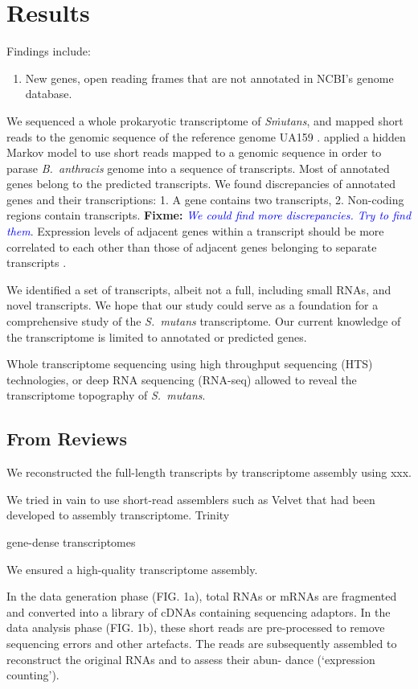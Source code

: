\documentclass{article}
\newcommand{\fixme}[1]{{\textbf{Fixme:} \textit{\textcolor{blue}{#1}}}}
\begin{document}
\section{Results}

Findings include:
\begin{enumerate}
\item New genes, open reading frames that are not annotated in NCBI's genome database.
\end{enumerate}

We sequenced a whole prokaryotic transcriptome of \textit{S\. mutans}, and
mapped short reads to the genomic sequence of the reference genome UA159
\citep{Ajdic2002}. 
\citet{Martin2010} applied a hidden Markov model to use short reads mapped to a
genomic sequence in order to parase \textit{B.\ anthracis} genome into a
sequence of transcripts. Most of annotated genes belong to the predicted
transcripts. We found discrepancies of annotated genes and their transcriptions:
1. A gene contains two transcripts, 
2. Non-coding regions contain transcripts.
\fixme{We could find more discrepancies. Try to find them}. 
Expression levels of adjacent genes within a transcript should be more
correlated to each other than those of adjacent genes belonging to separate transcripts
\citep{Martin2010}. 

We identified a set of transcripts, albeit not a full, including small RNAs, and novel
transcripts. 
We hope that our study could serve as a foundation for a comprehensive study of
the \textit{S.\ mutans} transcriptome.
Our current knowledge of the transcriptome is limited to annotated or predicted genes.

Whole transcriptome sequencing using high throughput sequencing (HTS)
technologies, or deep RNA sequencing (RNA-seq) allowed to reveal the
transcriptome topography of \textit{S.\ mutans}. 

\subsection{From Reviews}
We reconstructed the full-length transcripts by transcriptome assembly using
xxx.

We tried in vain to use short-read assemblers such as Velvet \citep{Zerbino2008} that had been developed to
assembly transcriptome.
Trinity

gene-dense transcriptomes

We ensured a high-quality transcriptome assembly. 

In the data generation phase (FIG. 1a), total RNAs or mRNAs are fragmented and
converted into a library of cDNAs containing sequencing adaptors.  
In the data analysis phase (FIG. 1b), these short reads are pre-processed to
remove sequencing errors and other artefacts. The reads are subsequently
assembled to reconstruct the original RNAs and to assess their abun- dance
(‘expression counting’).
\end{document}
